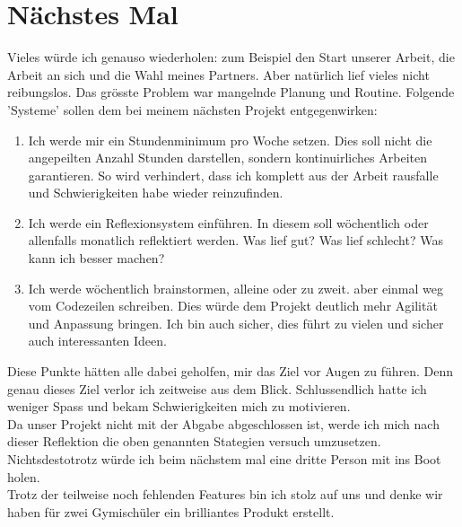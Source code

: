 \section{Nächstes Mal}
Vieles würde ich genauso wiederholen:
zum Beispiel den Start unserer Arbeit, die Arbeit an sich und die Wahl meines Partners.
Aber natürlich lief vieles nicht reibungslos.
Das grösste Problem war mangelnde Planung und Routine.
Folgende 'Systeme' sollen dem bei meinem nächsten Projekt entgegenwirken:
\begin{enumerate}
    \item Ich werde mir ein Stundenminimum pro Woche setzen.
    Dies soll nicht die angepeilten Anzahl Stunden darstellen, sondern kontinuirliches Arbeiten garantieren.
    So wird verhindert, dass ich komplett aus der Arbeit rausfalle und Schwierigkeiten habe wieder reinzufinden.
    \item Ich werde ein Reflexionsystem einführen.
    In diesem soll wöchentlich oder allenfalls monatlich reflektiert werden.
    Was lief gut? Was lief schlecht? Was kann ich besser machen?
    \item Ich werde wöchentlich brainstormen, alleine oder zu zweit. 
    aber einmal weg vom Codezeilen schreiben.
    Dies würde dem Projekt deutlich mehr Agilität und Anpassung bringen.
    Ich bin auch sicher, dies führt zu vielen und sicher auch interessanten Ideen.
\end{enumerate}
Diese Punkte hätten alle dabei geholfen, mir das Ziel vor Augen zu führen.
Denn genau dieses Ziel verlor ich zeitweise aus dem Blick.
Schlussendlich hatte ich weniger Spass und bekam Schwierigkeiten mich zu motivieren. \\
Da unser Projekt nicht mit der Abgabe abgeschlossen ist, werde ich mich nach dieser Reflektion die oben genannten Stategien versuch umzusetzen. 
Nichtsdestotrotz würde ich beim nächstem mal eine dritte Person mit ins Boot holen.\\
Trotz der teilweise noch fehlenden Features bin ich stolz auf uns und denke wir haben für zwei Gymischüler ein brilliantes Produkt erstellt.
